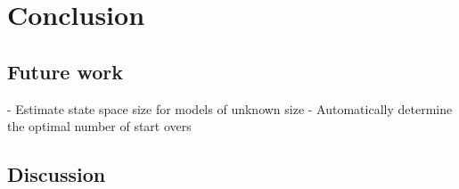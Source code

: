 \documentclass[
fancyheadings, %
%
%
]{stsreprt}
\begin{document}
\chapter{Conclusion}

\section{Future work}

- Estimate state space size for models of unknown size
- Automatically determine the optimal number of start overs

\section{Discussion}



\backmatter

\printbibliography[heading=bibintoc]
\end{document}
